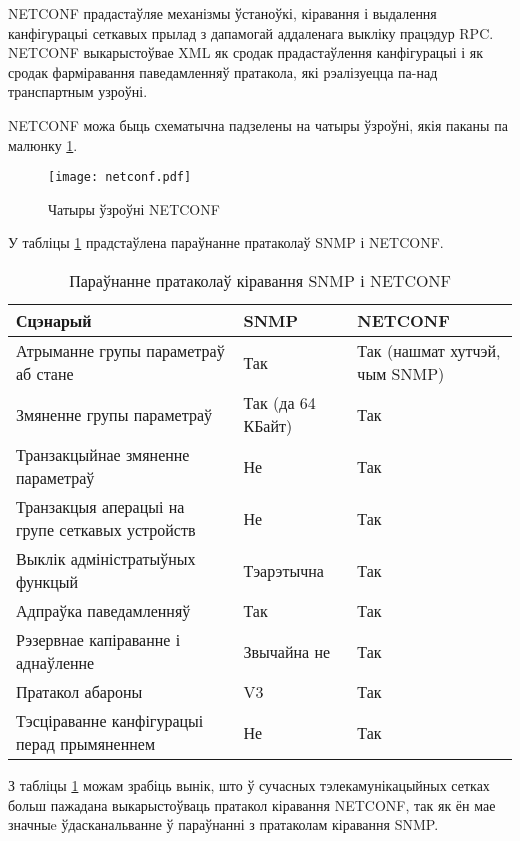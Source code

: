 NETCONF прадастаўляе механізмы ўстаноўкі, кіравання і выдалення канфігурацыі сеткавых прылад з дапамогай аддаленага выкліку працэдур RPC. NETCONF выкарыстоўвае XML як сродак прадастаўлення канфігурацыі і як сродак фарміравання паведамленняў пратакола, які рэалізуецца па-над транспартным узроўні.

NETCONF можа быць схематычна падзелены на чатыры ўзроўні, якія паканы па малюнку \ref{img: netconf}.

\clearpage

\begin{figure}[ht!]
    \centering
    \texttt{[image: netconf.pdf]}
    \caption{Чатыры ўзроўні NETCONF}
    \label{img: netconf}
\end{figure}

У табліцы \ref{table: netconf} прадстаўлена параўнанне пратаколаў SNMP і NETCONF.

\clearpage

\begin{table}[htp]
    \caption{Параўнанне пратаколаў кіравання SNMP і NETCONF}
    \begin{tabularx}{\textwidth}{ 
        | >{\centering\arraybackslash}X 
        | >{\centering\arraybackslash}X 
        | >{\centering\arraybackslash}X |
    }
    \hline
    Сцэнарый & SNMP & NETCONF \\
    \hline
    Атрыманне групы параметраў аб стане & Так & Так (нашмат хутчэй, чым SNMP) \\
    \hline
    Змяненне групы параметраў &  Так (да 64 КБайт) & Так \\
    \hline
    Транзакцыйнае змяненне параметраў & Не & Так \\
    \hline
    Транзакцыя аперацыі на групе сеткавых устройств & Не & Так \\
    \hline
    Выклік адміністратыўных функцый & Тэарэтычна & Так \\
    \hline
    Адпраўка паведамленняў & Так & Так \\
    \hline
    Рэзервнае капіраванне і аднаўленне & Звычайна не & Так \\
    \hline
    Пратакол абароны & V3 & Так \\
    \hline
    Тэсціраванне канфігурацыі перад прымяненнем & Не & Так \\
    \hline
    \end{tabularx}
    \label{table: netconf}
\end{table}

З табліцы \ref{table: netconf} можам зрабіць вынік, што ў сучасных тэлекамунікацыйных сетках
больш пажадана выкарыстоўваць пратакол кіравання NETCONF, так як ён мае значныe ўдасканальванне
ў параўнанні з пратаколам кіравання SNMP.

